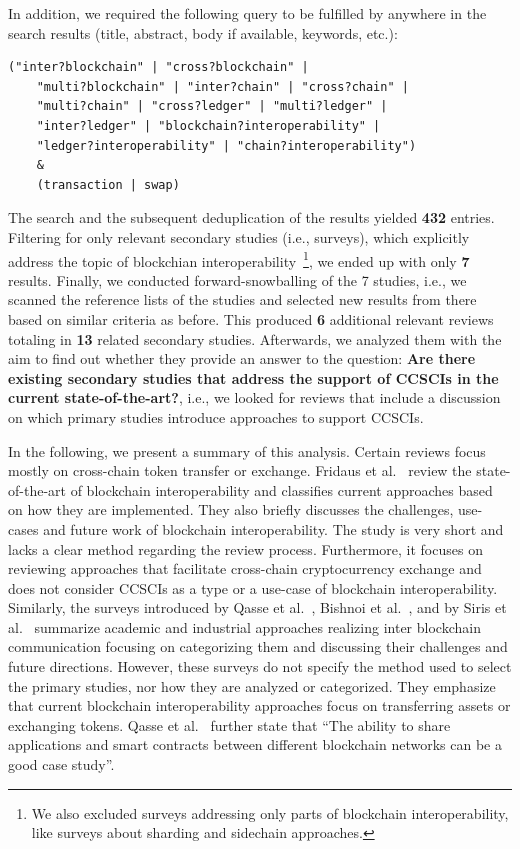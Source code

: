 \documentclass[review]{elsarticle}
\begin{document}
In addition, we required the following query to be fulfilled by anywhere in the search results (title, abstract, body if available, keywords, etc.):
\begin{lstlisting}[caption={The query term used to search for primary and secondary studies.},label={lst:query-string}]
	("inter?blockchain" | "cross?blockchain" | 
	"multi?blockchain" | "inter?chain" | "cross?chain" |
	"multi?chain" | "cross?ledger" | "multi?ledger" | 
	"inter?ledger" | "blockchain?interoperability" | 
	"ledger?interoperability" | "chain?interoperability") 
	& 
	(transaction | swap)
\end{lstlisting}

The search and the subsequent deduplication of the results yielded \textbf{432} entries.
Filtering for only relevant secondary studies (i.e., surveys), which explicitly address the topic of blockchian interoperability~\footnote{We also excluded surveys addressing only parts of blockchain interoperability, like surveys about sharding and sidechain approaches.}, we ended up with only \textbf{7} results.
Finally, we conducted forward-snowballing of the 7 studies, i.e., we scanned the reference lists of the studies and selected new results from there based on similar criteria as before.
This produced \textbf{6} additional relevant reviews totaling in \textbf{13} related secondary studies.
Afterwards, we analyzed them with the aim to find out whether they provide an answer to the question: \textbf{Are there existing secondary studies that address the support of CCSCIs in the current state-of-the-art?}, i.e., we looked for reviews that include a discussion on which primary studies introduce approaches to support CCSCIs.

In the following, we present a summary of this analysis.
Certain reviews focus mostly on cross-chain token transfer or exchange.
Fridaus et al.~\cite{Fridaus2020InteroperabilityReview} review the state-of-the-art of blockchain interoperability and classifies current approaches based on how they are implemented.
They also briefly discusses the challenges, use-cases and future work of blockchain interoperability.
The study is very short and lacks a clear method regarding the review process.
Furthermore, it focuses on reviewing approaches that facilitate cross-chain cryptocurrency exchange and does not consider CCSCIs as a type or a use-case of blockchain interoperability.
Similarly, the surveys introduced by Qasse et al.~\cite{Qasse2019}, Bishnoi et al.~\cite{Bishnoi2020Interoperability}, and by Siris et al.~\cite{Siris2019} summarize academic and industrial approaches realizing inter blockchain communication focusing on categorizing them and discussing their challenges and future directions.
However, these surveys do not specify the method used to select the primary studies, nor how they are analyzed or categorized.
They emphasize that current blockchain interoperability approaches focus on transferring assets or exchanging tokens.
Qasse et al.~\cite{Qasse2019} further state that \enquote{The ability to share applications and smart contracts between different blockchain networks can be a good case study}.
\end{document}
